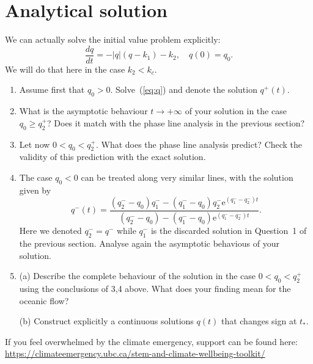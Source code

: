 \documentclass[10pt, letterpaper, answer]{exam}
\begin{document}
\section{Analytical solution}
We can actually solve the initial value problem explicitly:
\begin{equation}
    \dfrac{dq}{dt} = -|q|(q - k_1) - k_2, \quad q(0)=q_0.\label{eq:q}
\end{equation}
We will do that here in the case $k_2<k_c$.
\begin{enumerate}
\item Assume first that $q_0>0$. Solve~(\ref{eq:q}) and denote the solution $q^+(t)$. 

\item What is the asymptotic behaviour $t\to+\infty$ of your solution in the case $q_0\geq q_2^+$? Does it match with the phase line analysis in the previous section?

\item Let now $0<q_0<q_2^+$. What does the phase line analysis predict? Check the validity of this prediction with the exact solution.




\item The case $q_0<0$ can be treated along very similar lines, with the solution given by
%
\begin{equation*}
q^-(t)  = \frac{(q^-_2-q_0)q^-_1 - (q^-_1-q_0)q^-_2 \mathrm{e}^{(q^-_1-q^-_2)t}}{(q^-_2-q_0)-(q^-_1-q_0)\mathrm{e}^{(q^-_1-q^-_2)t}}.
\end{equation*}
%
Here we denoted $q^-_2 = q^-$ while $q^-_1$ is the discarded solution in Question~1 of the previous section. Analyse again the asymptotic behavious of your solution.


\item (a) Describe the complete behaviour of the solution in the case $0<q_0<q_2^+$ using the conclusions of 3,4 above. What does your finding mean for the oceanic flow?

(b) Construct explicitly a continuous solutions $q(t)$ that changes sign at $t_*$.
%


\end{enumerate}

\vspace*{\fill}

\noindent If you feel overwhelmed by the climate emergency, support can be found here: \\
\url{https://climateemergency.ubc.ca/stem-and-climate-wellbeing-toolkit/}
\end{document}
